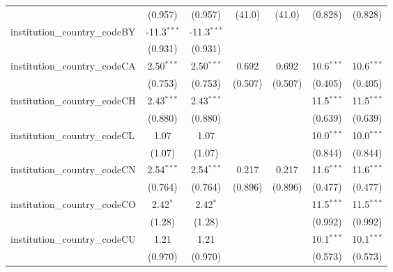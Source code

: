 \begin{tabular}{lcccccc}
                                         & (0.957)        & (0.957)        & (41.0)        & (41.0)        & (0.828)       & (0.828)\\   
   institution\_country\_codeBY          & -11.3$^{***}$  & -11.3$^{***}$  &               &               &               &   \\   
                                         & (0.931)        & (0.931)        &               &               &               &   \\   
   institution\_country\_codeCA          & 2.50$^{***}$   & 2.50$^{***}$   & 0.692         & 0.692         & 10.6$^{***}$  & 10.6$^{***}$\\   
                                         & (0.753)        & (0.753)        & (0.507)       & (0.507)       & (0.405)       & (0.405)\\   
   institution\_country\_codeCH          & 2.43$^{***}$   & 2.43$^{***}$   &               &               & 11.5$^{***}$  & 11.5$^{***}$\\   
                                         & (0.880)        & (0.880)        &               &               & (0.639)       & (0.639)\\   
   institution\_country\_codeCL          & 1.07           & 1.07           &               &               & 10.0$^{***}$  & 10.0$^{***}$\\   
                                         & (1.07)         & (1.07)         &               &               & (0.844)       & (0.844)\\   
   institution\_country\_codeCN          & 2.54$^{***}$   & 2.54$^{***}$   & 0.217         & 0.217         & 11.6$^{***}$  & 11.6$^{***}$\\   
                                         & (0.764)        & (0.764)        & (0.896)       & (0.896)       & (0.477)       & (0.477)\\   
   institution\_country\_codeCO          & 2.42$^{*}$     & 2.42$^{*}$     &               &               & 11.5$^{***}$  & 11.5$^{***}$\\   
                                         & (1.28)         & (1.28)         &               &               & (0.992)       & (0.992)\\   
   institution\_country\_codeCU          & 1.21           & 1.21           &               &               & 10.1$^{***}$  & 10.1$^{***}$\\   
                                         & (0.970)        & (0.970)        &               &               & (0.573)       & (0.573)\\   

\end{tabular}
